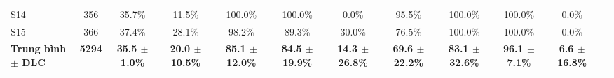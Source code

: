\begin{table}[t]
\begin{tabular}{lcccc|ccc|cccc}
S14 & 356 & 35.7\% & 11.5\% & 100.0\% & 100.0\% & 0.0\% & 95.5\% & 100.0\% & 100.0\% & 0.0\% \\
S15 & 366 & 37.4\% & 28.1\% & 98.2\% & 89.3\% & 30.0\% & 76.5\% & 100.0\% & 100.0\% & 0.0\% \\
\midrule
\textbf{Trung bình $\pm$ ĐLC} & \textbf{5294} & \textbf{35.5 $\pm$ 1.0\%} & \textbf{20.0 $\pm$ 10.5\%} & \textbf{85.1 $\pm$ 12.0\%} & \textbf{84.5 $\pm$ 19.9\%} & \textbf{14.3 $\pm$ 26.8\%} & \textbf{69.6 $\pm$ 22.2\%} & \textbf{83.1 $\pm$ 32.6\%} & \textbf{96.1 $\pm$ 7.1\%} & \textbf{6.6 $\pm$ 16.8\%} \\
\bottomrule
\end{tabular}
\end{table}